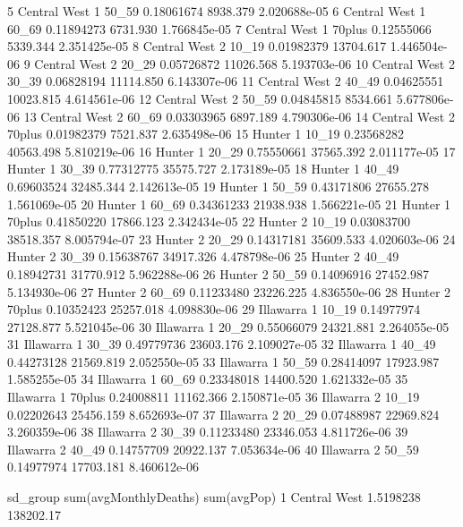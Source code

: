 \documentclass[a4paper]{article}                %
\begin{document}
\begin{Schunk}
\begin{Soutput}
5  Central West   1  50_59       0.18061674  8938.379 2.020688e-05
6  Central West   1  60_69       0.11894273  6731.930 1.766845e-05
7  Central West   1 70plus       0.12555066  5339.344 2.351425e-05
8  Central West   2  10_19       0.01982379 13704.617 1.446504e-06
9  Central West   2  20_29       0.05726872 11026.568 5.193703e-06
10 Central West   2  30_39       0.06828194 11114.850 6.143307e-06
11 Central West   2  40_49       0.04625551 10023.815 4.614561e-06
12 Central West   2  50_59       0.04845815  8534.661 5.677806e-06
13 Central West   2  60_69       0.03303965  6897.189 4.790306e-06
14 Central West   2 70plus       0.01982379  7521.837 2.635498e-06
15       Hunter   1  10_19       0.23568282 40563.498 5.810219e-06
16       Hunter   1  20_29       0.75550661 37565.392 2.011177e-05
17       Hunter   1  30_39       0.77312775 35575.727 2.173189e-05
18       Hunter   1  40_49       0.69603524 32485.344 2.142613e-05
19       Hunter   1  50_59       0.43171806 27655.278 1.561069e-05
20       Hunter   1  60_69       0.34361233 21938.938 1.566221e-05
21       Hunter   1 70plus       0.41850220 17866.123 2.342434e-05
22       Hunter   2  10_19       0.03083700 38518.357 8.005794e-07
23       Hunter   2  20_29       0.14317181 35609.533 4.020603e-06
24       Hunter   2  30_39       0.15638767 34917.326 4.478798e-06
25       Hunter   2  40_49       0.18942731 31770.912 5.962288e-06
26       Hunter   2  50_59       0.14096916 27452.987 5.134930e-06
27       Hunter   2  60_69       0.11233480 23226.225 4.836550e-06
28       Hunter   2 70plus       0.10352423 25257.018 4.098830e-06
29    Illawarra   1  10_19       0.14977974 27128.877 5.521045e-06
30    Illawarra   1  20_29       0.55066079 24321.881 2.264055e-05
31    Illawarra   1  30_39       0.49779736 23603.176 2.109027e-05
32    Illawarra   1  40_49       0.44273128 21569.819 2.052550e-05
33    Illawarra   1  50_59       0.28414097 17923.987 1.585255e-05
34    Illawarra   1  60_69       0.23348018 14400.520 1.621332e-05
35    Illawarra   1 70plus       0.24008811 11162.366 2.150871e-05
36    Illawarra   2  10_19       0.02202643 25456.159 8.652693e-07
37    Illawarra   2  20_29       0.07488987 22969.824 3.260359e-06
38    Illawarra   2  30_39       0.11233480 23346.053 4.811726e-06
39    Illawarra   2  40_49       0.14757709 20922.137 7.053634e-06
40    Illawarra   2  50_59       0.14977974 17703.181 8.460612e-06
\end{Soutput}
\begin{Soutput}
                sd_group sum(avgMonthlyDeaths) sum(avgPop)
1           Central West             1.5198238   138202.17

\end{Soutput}
\end{Schunk}
\end{document}
